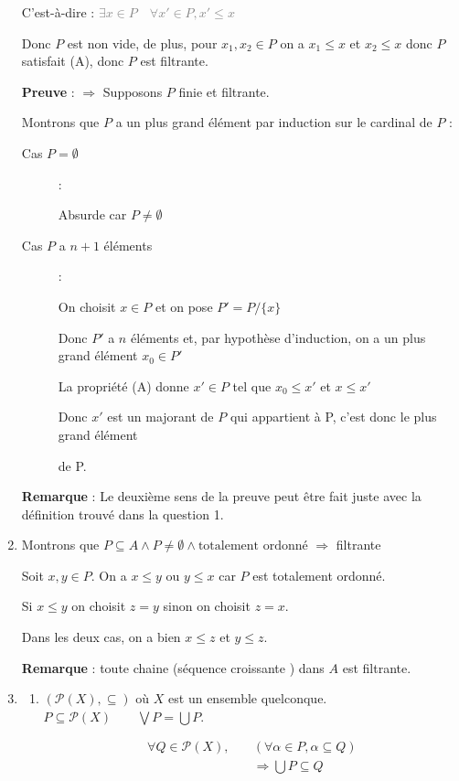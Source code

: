 \documentclass[12pt]{article}
\begin{document}
\begin{enumerate}
 C'est-à-dire :  \textcolor{gray}{$\exists x \in P \quad \forall x'\in P, x'\leq x$}

Donc $P$ est non vide, de plus, pour $x_1,x_2 \in P$ on a $x_1 \leq x$ et $x_2 \leq x$ donc $P$ satisfait (A), donc $P$ est filtrante. 


	\textbf{Preuve} : $\Rightarrow $ Supposons $P$ finie et filtrante. 

Montrons que $P$ a un plus grand élément par induction sur le cardinal de $P$ :
\begin{description}
    \item[Cas $P = \emptyset $]: 

        Absurde car $P \ne \emptyset $
    \item[Cas $P$ a $n+1$ éléments]:

        On choisit $x \in P$ et on pose $P'= P/\{x\}$ 

        Donc $P'$ a $n$ éléments et, par hypothèse d'induction, on a un plus grand élément $x_0 \in P'$
     

        La propriété (A) donne $x'\in P$ tel que $x_0 \leq x'$ et $x\leq x'$


Donc $x'$ est un majorant de $P$ qui appartient à P, c'est donc le plus grand élément 

de P.
\end{description}

\textbf{Remarque} : Le deuxième sens de la preuve peut être fait juste avec la définition trouvé dans la question 1.

\item Montrons que $ P \subseteq A \wedge P \neq \emptyset \wedge \text{totalement ordonné } \Rightarrow$ filtrante 

    Soit $x, y \in P$. On a $x \leq y$ ou $y \leq x$ car $P$ est totalement ordonné. 

    Si $x \leq y$ on choisit $z = y$ sinon on choisit $z = x$. 

    Dans les deux cas, on a bien $x \leq z$ et $y \leq z$.

\textbf{Remarque} : toute chaine (séquence croissante ) dans $A$ est filtrante.

\item \begin{enumerate}
    \item $(\mathcal{P}(X), \subseteq )$ où $X$ est un ensemble quelconque. 
        $P \subseteq \mathcal{P}(X) \qquad \bigvee P = \bigcup P$. 

        \begin{align*}
            \forall Q \in \mathcal{P}(X),\quad & (\forall \alpha \in P, \alpha \subseteq Q)\\ &\Rightarrow \bigcup P \subseteq Q
        \end{align*}


\end{enumerate}
\end{enumerate}
\end{document}
